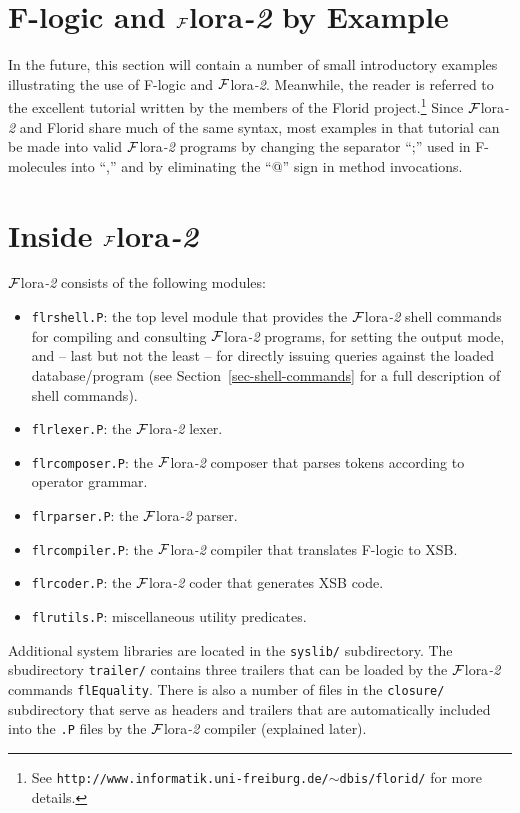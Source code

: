 \documentclass[11pt]{article}
\newcommand{\FLORA}{{\mbox{${\cal F}${\sc lora}\rm\emph{-2}}}\xspace}
\newcommand{\FLORID}{{\mbox{\sc Florid}}\xspace}
\newcommand{\fl}{\mbox{F-logic}\xspace}
\begin{document}
 
\section{\fl and \FLORA by Example}


In the future, this section will contain a number of small
introductory examples illustrating the use of \fl and \FLORA. Meanwhile, the
reader is referred to the excellent tutorial written by the members of the
\FLORID project.\footnote{
  See {\tt http://www.informatik.uni-freiburg.de/$\sim$dbis/florid/} for more
  details.
  }
Since \FLORA and \FLORID share much of the same syntax, most examples in that
tutorial can be made into valid \FLORA programs by changing the separator
``;'' used in F-molecules into ``,'' and by eliminating the ``@''
sign in method invocations.



\section{Inside \FLORA}


\FLORA consists of the following modules:
\begin{itemize}
\item \texttt{flrshell.P}: the top level module that provides the \FLORA shell
  commands for compiling and consulting \FLORA programs, for setting the output mode,
  and -- last but not the least -- for directly issuing queries against the loaded
  database/program (see Section~\ref{sec-shell-commands} for a full
  description of shell commands).
\item \texttt{flrlexer.P}: the \FLORA lexer.
\item \texttt{flrcomposer.P}: the \FLORA composer that parses tokens according to operator grammar.
\item \texttt{flrparser.P}: the \FLORA parser.
\item \texttt{flrcompiler.P}: the \FLORA compiler that translates \fl to XSB.
\item \texttt{flrcoder.P}: the \FLORA coder that generates XSB code.
\item \texttt{flrutils.P}: miscellaneous utility predicates.
\end{itemize}
Additional system libraries are located in the {\tt syslib/} subdirectory.
The sbudirectory {\tt trailer/} contains three trailers that can be
loaded by the \FLORA commands {\tt flEquality}. There
is also a number of files in the {\tt closure/} subdirectory that serve as
headers and trailers that are automatically included into the {\tt .P} files by the
\FLORA compiler (explained later).
\end{document}
